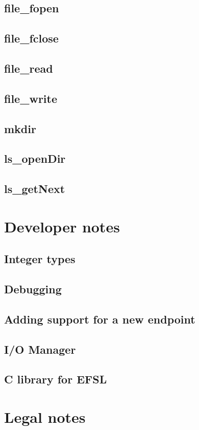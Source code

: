 \documentclass[a4paper,fleqn]{article}
\begin{document}
\subsection{file\_fopen}
	
	\newpage
\subsection{file\_fclose}
	
	\newpage
\subsection{file\_read}
	
	\newpage
\subsection{file\_write}
	
	\newpage
\subsection{mkdir}
	
	\newpage
\subsection{ls\_openDir}
	
	\newpage
\subsection{ls\_getNext}
	
	\newpage

\newpage
\section{Developer notes}
\subsection{Integer types}
	
\subsection{Debugging}
	
\subsection{Adding support for a new endpoint}
	
\subsection{I/O Manager}
	
\subsection{C library for EFSL}
	
	
\newpage
\section{Legal notes}
	
\end{document}
